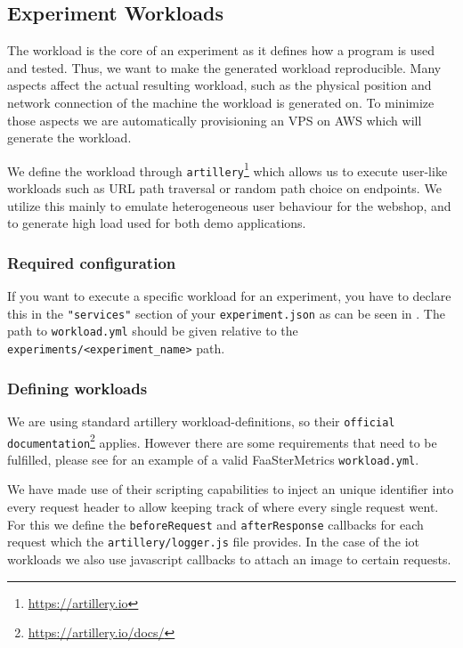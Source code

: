 \documentclass[../main.tex]{subfiles}
\begin{document}
\subsection{Experiment Workloads}\label{sec:WorkloadsStructure}

The workload is the core of an experiment as it defines how a program is used and tested. 
Thus, we want to make the generated workload reproducible. 
Many aspects affect the actual resulting workload, 
such as the physical position and network connection of the machine the workload is generated on. 
To minimize those aspects we are automatically provisioning an VPS on AWS which will generate the workload.

We define the workload through \texttt{artillery}\footnote{\url{https://artillery.io}} which allows us to 
execute user-like workloads such as URL path traversal or random path choice on endpoints. 
We utilize this mainly to emulate heterogeneous user behaviour for the webshop, 
and to generate high load used for both demo applications.

\subsubsection{Required configuration}

If you want to execute a specific workload for an experiment, 
you have to declare this in the \texttt{"services"} section of your \texttt{experiment.json} as can be seen in .
The path to \texttt{workload.yml} should be given relative to the \texttt{experiments/<experiment\_name>} path. 

\subsubsection{Defining workloads}

We are using standard artillery workload-definitions, 
so their \texttt{official documentation}\footnote{\url{https://artillery.io/docs/}} applies. 
However there are some requirements that need to be fulfilled, 
please see  for an example of a valid FaaSterMetrics \texttt{workload.yml}.

We have made use of their scripting capabilities to inject an unique identifier 
into every request header to allow keeping track of where every single request went. 
For this we define the \texttt{beforeRequest} and \texttt{afterResponse} callbacks for each request 
which the \texttt{artillery/logger.js} file provides.
In the case of the iot workloads we also use javascript callbacks to attach an image to certain requests.
\end{document}
